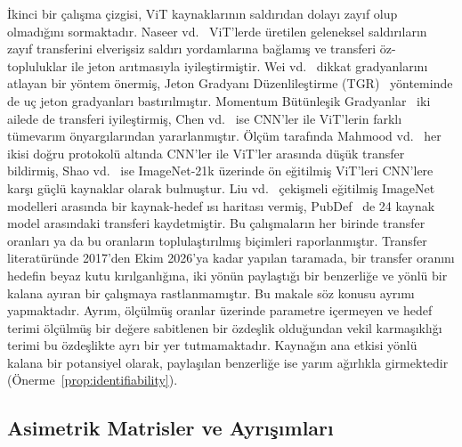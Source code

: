 İkinci bir çalışma çizgisi, ViT kaynaklarının saldırıdan dolayı zayıf olup olmadığını sormaktadır. Naseer vd.~\cite{naseer2022improving} ViT'lerde üretilen geleneksel saldırıların zayıf transferini elverişsiz saldırı yordamlarına bağlamış ve transferi öz-topluluklar ile jeton arıtmasıyla iyileştirmiştir. Wei vd.~\cite{wei2022towards} dikkat gradyanlarını atlayan bir yöntem önermiş, Jeton Gradyanı Düzenlileştirme (TGR)~\cite{zhang2023tgr} yönteminde de uç jeton gradyanları bastırılmıştır. Momentum Bütünleşik Gradyanlar~\cite{ma2023transferable} iki ailede de transferi iyileştirmiş, Chen vd.~\cite{chen2023understanding} ise CNN'ler ile ViT'lerin farklı tümevarım önyargılarından yararlanmıştır. Ölçüm tarafında Mahmood vd.~\cite{mahmood2021robustness} her ikisi doğru protokolü altında CNN'ler ile ViT'ler arasında düşük transfer bildirmiş, Shao vd.~\cite{shao2022adversarial} ise ImageNet-21k üzerinde ön eğitilmiş ViT'leri CNN'lere karşı güçlü kaynaklar olarak bulmuştur. Liu vd.~\cite{liu2023comprehensive} çekişmeli eğitilmiş ImageNet modelleri arasında bir kaynak-hedef ısı haritası vermiş, PubDef~\cite{sitawarin2024pubdef} de 24 kaynak model arasındaki transferi kaydetmiştir. Bu çalışmaların her birinde transfer oranları ya da bu oranların toplulaştırılmış biçimleri raporlanmıştır. Transfer literatüründe 2017'den Ekim 2026'ya kadar yapılan taramada, bir transfer oranını hedefin beyaz kutu kırılganlığına, iki yönün paylaştığı bir benzerliğe ve yönlü bir kalana ayıran bir çalışmaya rastlanmamıştır. Bu makale söz konusu ayrımı yapmaktadır. Ayrım, ölçülmüş oranlar üzerinde parametre içermeyen ve hedef terimi ölçülmüş bir değere sabitlenen bir özdeşlik olduğundan vekil karmaşıklığı terimi bu özdeşlikte ayrı bir yer tutmamaktadır. Kaynağın ana etkisi yönlü kalana bir potansiyel olarak, paylaşılan benzerliğe ise yarım ağırlıkla girmektedir (Önerme~\ref{prop:identifiability}).

\subsection{Asimetrik Matrisler ve Ayrışımları}
\label{subsec:rw_decomposition}

